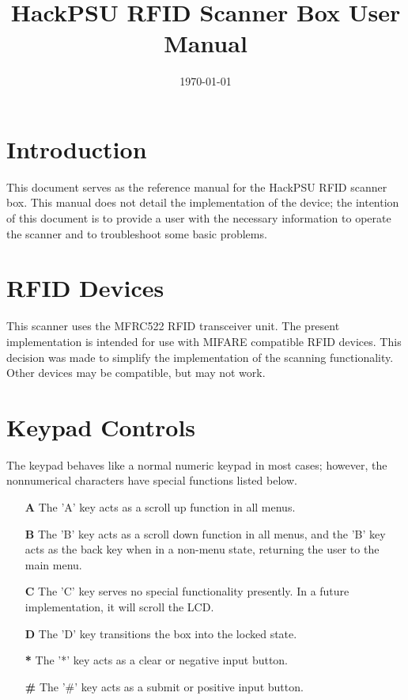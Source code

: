 \documentclass{article}
\title{HackPSU RFID Scanner Box User Manual}
\date{\today}
\begin{document}
\maketitle

\section*{Introduction}
This document serves as the reference manual for the HackPSU RFID scanner box.  This manual does not detail the implementation of the device; the intention of this document is to provide a user with the necessary information to operate the scanner and to troubleshoot some basic problems.

\tableofcontents

\section{RFID Devices}
This scanner uses the MFRC522 RFID transceiver unit. The present implementation is intended for use with MIFARE compatible RFID devices.  This decision was made to simplify the implementation of the scanning functionality.  Other devices may be compatible, but may not work.  

\section{Keypad Controls}
The keypad behaves like a normal numeric keypad in most cases; however, the nonnumerical characters have special functions listed below.  
\begin{itemize}
	\item[\textbf{A}] The 'A' key acts as a scroll up function in all menus.
	\item[\textbf{B}] The 'B' key acts as a scroll down function in all menus, and the 'B' key acts as the back key when in a non-menu state, returning the user to the main menu.
	\item[\textbf{C}] The 'C' key serves no special functionality presently.  In a future implementation, it will scroll the LCD.
	\item[\textbf{D}] The 'D' key transitions the box into the locked state.
	\item[\textbf{*}] The '*' key acts as a clear or negative input button.  
	\item[\textbf{\#}] The '\#' key acts as a submit or positive input button.
\end{itemize}
\end{document}
